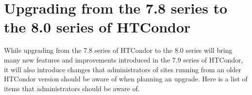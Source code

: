 \section{Upgrading from the 7.8 series to the 8.0 series of HTCondor}\label{sec:to-8.0}

While upgrading from the 7.8 series of HTCondor to the 8.0 series 
will bring many
new features and improvements introduced in the 7.9 series of HTCondor,
it will
also introduce changes that administrators of sites running from an older
HTCondor version should be aware of when planning an upgrade.  
Here is a list of items that administrators should be aware of.

